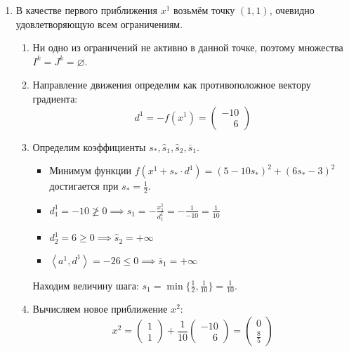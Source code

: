 \documentclass{article}
\renewcommand{\leq}{\leqslant}
\renewcommand{\geq}{\geqslant}
\renewcommand{\ngeq}{\ngeqslant}
\newcommand{\mul}{\cdot}
\newcommand{\scalmult}[1]{{\left \langle #1 \right \rangle}}
\theoremstyle{remark}
\theoremstyle{definition}
\numberwithin{equation}{section}
\begin{document}
\begin{enumerate}
  \renewcommand{\labelenumi}{\textbf{Итерация \arabic{enumi}.}}
  \renewcommand{\labelenumii}{\textbf{Шаг \arabic{enumii}.}}
\item
  В качестве первого приближения $x^1$ возьмём точку $(1, 1)$, очевидно
  удовлетворяющую всем ограничениям.
  \begin{enumerate}
  \item Ни одно из ограничений не активно в данной точке, поэтому
    множества $I^k = J^k = \varnothing$.
  \item Направление движения определим как противоположное вектору
    градиента:
    \begin{equation*}
      d^1 = -f(x^1) = \begin{pmatrix} -10 \\ \phantom{-}6 \end{pmatrix}
    \end{equation*}
  \item Определим коэффициенты $s_*, \hat{s}_1, \hat{s}_2, \bar{s}_1$.
    \begin{itemize}
    \item Минимум функции $f(x^1+s_*\mul d^1) = (5-10s_*)^2+(6s_*-3)^2$
      достигается при $s_*=\frac{1}{2}$.
    \item $d^1_1 = -10 \ngeq 0 \implies \hat{s}_1 =
      -\frac{x^1_1}{d^1_1} = -\frac{1}{-10} = \frac{1}{10}$
    \item $d^1_2 = 6 \geq 0 \implies \hat{s}_2 = +\infty$
    \item $\scalmult{a^1, d^1} = -26 \leq
      0 \implies \bar{s}_1 = +\infty$
    \end{itemize}
    Находим величину шага: $s_1 = \min\{\frac{1}{2}, \frac{1}{10}\} =
    \frac{1}{10}$.
  \item Вычисляем новое приближение $x^2$:
    \begin{equation*}
      x^2 = \begin{pmatrix} 1 \\ 1 \end{pmatrix} +
      \frac{1}{10} \begin{pmatrix} -10 \\ \phantom{-}6 \end{pmatrix}
      = \begin{pmatrix} 0 \\ \frac{8}{5} \end{pmatrix}
    \end{equation*}
  \end{enumerate}

\end{enumerate}
\end{document}
